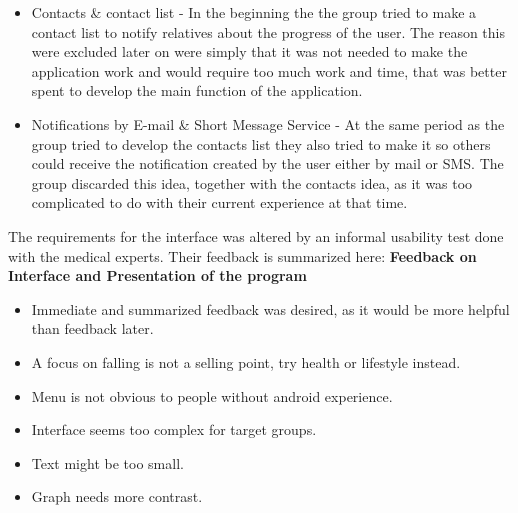 \begin{itemize} 
\item Contacts \& contact list - In the beginning the the group tried to make a contact list to notify relatives about the progress of the user. The reason this were excluded later on were simply that it was not needed to make the application work and would require too much work and time, that was better spent to develop the main function of the application. 
\item Notifications by E-mail \& Short Message Service - At the same period as the group tried to develop the contacts list they also tried to make it so others could receive the notification created by the user either by mail or SMS. The group discarded this idea, together with the contacts idea, as it was too complicated to do with their current experience at that time.
\end{itemize} 
The requirements for the interface was altered by an informal usability test done with the medical experts. Their feedback is summarized here: 
\textbf{Feedback on Interface and Presentation of the program}
\begin{itemize}
\item Immediate and summarized feedback was desired, as it would be more helpful than feedback later.
\item A focus on falling is not a selling point, try health or lifestyle instead.
\item Menu is not obvious to people without android experience.
\item Interface seems too complex for target groups.
\item Text might be too small.
\item Graph needs more contrast. 

\end{itemize}
